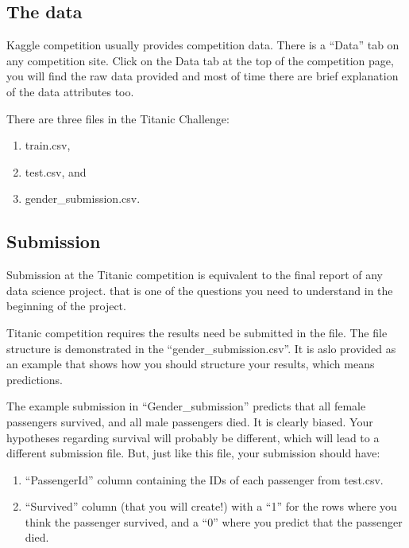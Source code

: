\documentclass[
]{book}
\providecommand{\tightlist}{%
  \setlength{\itemsep}{0pt}\setlength{\parskip}{0pt}}
\begin{document}
\hypertarget{the-data}{%
\subsection*{The data}\label{the-data}}


Kaggle competition usually provides competition data. There is a ``Data'' tab on any competition site. Click on the Data tab at the top of the competition page, you will find the raw data provided and most of time there are brief explanation of the data attributes too.

There are three files in the Titanic Challenge:

\begin{enumerate}
\def\labelenumi{(\arabic{enumi})}
\tightlist
\item
  train.csv,
\item
  test.csv, and
\item
  gender\_submission.csv.
\end{enumerate}

\hypertarget{submission}{%
\subsection*{Submission}\label{submission}}


Submission at the Titanic competition is equivalent to the final report of any data science project. that is one of the questions you need to understand in the beginning of the project.

Titanic competition requires the results need be submitted in the file. The file structure is demonstrated in the ``gender\_submission.csv''. It is aslo provided as an example that shows how you should structure your results, which means predictions.

The example submission in ``Gender\_submission'' predicts that all female passengers survived, and all male passengers died. It is clearly biased. Your hypotheses regarding survival will probably be different, which will lead to a different submission file. But, just like this file, your submission should have:

\begin{enumerate}
\def\labelenumi{\arabic{enumi}.}
\tightlist
\item
  ``PassengerId'' column containing the IDs of each passenger from test.csv.
\item
  ``Survived'' column (that you will create!) with a ``1'' for the rows where you think the passenger survived, and a ``0'' where you predict that the passenger died.
\end{enumerate}
\end{document}
